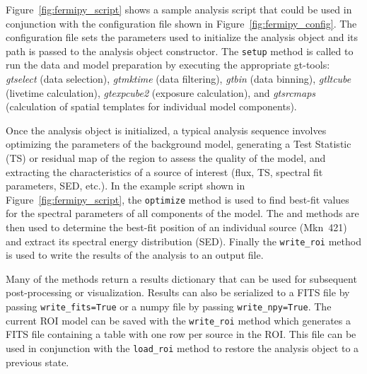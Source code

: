 \documentclass{PoS}
\begin{document}

Figure~\ref{fig:fermipy_script} shows a sample analysis script that
could be used in conjunction with the configuration file shown in
Figure~\ref{fig:fermipy_config}.  The configuration file sets the
parameters used to initialize the analysis object and its path is
passed to the analysis object constructor.  The \lstinline$setup$
method is called to run the data and model preparation by executing
the appropriate gt-tools: \emph{gtselect} (data selection),
\emph{gtmktime} (data filtering), \emph{gtbin} (data binning),
\emph{gtltcube} (livetime calculation), \emph{gtexpcube2} (exposure
calculation), and \emph{gtsrcmaps} (calculation of spatial templates
for individual model components).


Once the analysis object is initialized, a typical analysis sequence
involves optimizing the parameters of the background model, generating
a Test Statistic (TS) or residual map of the region to assess the
quality of the model, and extracting the characteristics of a source
of interest (flux, TS, spectral fit parameters, SED, etc.).  In the
example script shown in Figure~\ref{fig:fermipy_script}, the
\lstinline$optimize$ method is used to find best-fit values for the spectral parameters of all components of the model.
The {\localize} and {\sed} methods are then used to determine the
best-fit position of an individual source (Mkn~421) and extract its
spectral energy distribution (SED).  Finally the \lstinline$write_roi$
method is used to write the results of the analysis to an output file.

Many of the {\fermipy} methods return a results dictionary that can be
used for subsequent post-processing or visualization.  Results can
also be serialized to a FITS file by passing
\lstinline$write_fits=True$ or a numpy file by passing
\lstinline$write_npy=True$.  The current ROI model can be saved with the
\lstinline$write_roi$ method which generates a FITS file containing a
table with one row per source in the ROI.  This file can be used in
conjunction with the \lstinline$load_roi$ method to restore the
analysis object to a previous state.

\end{document}
